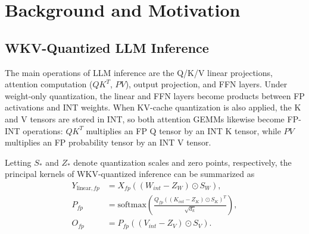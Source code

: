 \documentclass[sigconf,anonymous,nonacm]{acmart}
\newcommand{\fpint}{FP-INT}
\newcommand{\wkv}{WKV}
\newcommand{\Cfou}{FINISH}
\begin{document}

\section{Background and Motivation}
\subsection{WKV-Quantized LLM Inference}

The main operations of LLM inference are the Q/K/V linear projections, attention computation ($QK^T$, $PV$), output projection, and FFN layers. Under weight-only quantization, the linear and FFN layers become products between FP activations and INT weights. When KV-cache quantization is also applied, the K and V tensors are stored in INT, so both attention GEMMs likewise become \fpint{} operations: $QK^T$ multiplies an FP Q tensor by an INT K tensor, while $PV$ multiplies an FP probability tensor by an INT V tensor.

Letting $S_*$ and $Z_*$ denote quantization scales and zero points, respectively, the principal kernels of \wkv{}-quantized inference can be summarized as
\begin{align}
    Y_{\mathrm{linear},fp}
    &=
    X_{fp}
    \left(
        \left(
            W_{int}
            -
            Z_W
        \right)
        \odot
        S_W
    \right),
    \\
    P_{fp}
    &=
    \mathrm{softmax}
    \left(
        \frac{
            Q_{fp}
            \left(
                \left(
                    K_{int}
                    -
                    Z_K
                \right)
                \odot
                S_K
            \right)^T
        }{
            \sqrt{d_k}
        }
    \right),
    \\
    O_{fp}
    &=
    P_{fp}
    \left(
        \left(
            V_{int}
            -
            Z_V
        \right)
        \odot
        S_V
    \right).
\end{align}
\end{document}
